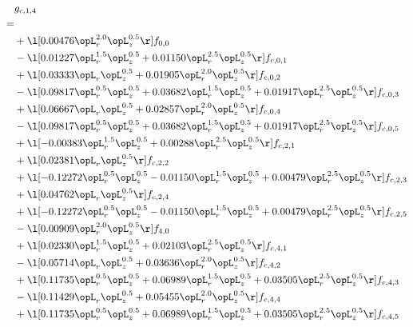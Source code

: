 \begin{alignat}{2} 
\label{eq:g_14_0} 
& g_{c,1,4} \nonumber \\ 
 = \\ 
& + \l[  0.00476 \opL_r^{2.0} \opL_z^{0.5}  \r] f_{0,0} \nonumber \\ 
& - \l[  0.01227 \opL_r^{1.5} \opL_z^{0.5} +  0.01150 \opL_r^{2.5} \opL_z^{0.5}  \r] f_{c,0,1} \nonumber \\ 
& + \l[  0.03333 \opL_r \opL_z^{0.5} +  0.01905 \opL_r^{2.0} \opL_z^{0.5}  \r] f_{c,0,2} \nonumber \\ 
& - \l[  0.09817 \opL_r^{0.5} \opL_z^{0.5} +  0.03682 \opL_r^{1.5} \opL_z^{0.5} +  0.01917 \opL_r^{2.5} \opL_z^{0.5}  \r] f_{c,0,3} \nonumber \\ 
& + \l[  0.06667 \opL_r \opL_z^{0.5} +  0.02857 \opL_r^{2.0} \opL_z^{0.5}  \r] f_{c,0,4} \nonumber \\ 
& - \l[  0.09817 \opL_r^{0.5} \opL_z^{0.5} +  0.03682 \opL_r^{1.5} \opL_z^{0.5} +  0.01917 \opL_r^{2.5} \opL_z^{0.5}  \r] f_{c,0,5} \nonumber \\ 
& + \l[  -0.00383 \opL_r^{1.5} \opL_z^{0.5} +  0.00288 \opL_r^{2.5} \opL_z^{0.5}  \r] f_{c,2,1} \nonumber \\ 
& + \l[  0.02381 \opL_r \opL_z^{0.5}  \r] f_{c,2,2} \nonumber \\ 
& + \l[  -0.12272 \opL_r^{0.5} \opL_z^{0.5}   -0.01150 \opL_r^{1.5} \opL_z^{0.5} +  0.00479 \opL_r^{2.5} \opL_z^{0.5}  \r] f_{c,2,3} \nonumber \\ 
& + \l[  0.04762 \opL_r \opL_z^{0.5}  \r] f_{c,2,4} \nonumber \\ 
& + \l[  -0.12272 \opL_r^{0.5} \opL_z^{0.5}   -0.01150 \opL_r^{1.5} \opL_z^{0.5} +  0.00479 \opL_r^{2.5} \opL_z^{0.5}  \r] f_{c,2,5} \nonumber \\ 
& - \l[  0.00909 \opL_r^{2.0} \opL_z^{0.5}  \r] f_{4,0} \nonumber \\ 
& + \l[  0.02330 \opL_r^{1.5} \opL_z^{0.5} +  0.02103 \opL_r^{2.5} \opL_z^{0.5}  \r] f_{c,4,1} \nonumber \\ 
& - \l[  0.05714 \opL_r \opL_z^{0.5} +  0.03636 \opL_r^{2.0} \opL_z^{0.5}  \r] f_{c,4,2} \nonumber \\ 
& + \l[  0.11735 \opL_r^{0.5} \opL_z^{0.5} +  0.06989 \opL_r^{1.5} \opL_z^{0.5} +  0.03505 \opL_r^{2.5} \opL_z^{0.5}  \r] f_{c,4,3} \nonumber \\ 
& - \l[  0.11429 \opL_r \opL_z^{0.5} +  0.05455 \opL_r^{2.0} \opL_z^{0.5}  \r] f_{c,4,4} \nonumber \\ 
& + \l[  0.11735 \opL_r^{0.5} \opL_z^{0.5} +  0.06989 \opL_r^{1.5} \opL_z^{0.5} +  0.03505 \opL_r^{2.5} \opL_z^{0.5}  \r] f_{c,4,5} \nonumber \\ 
\end{alignat} 


